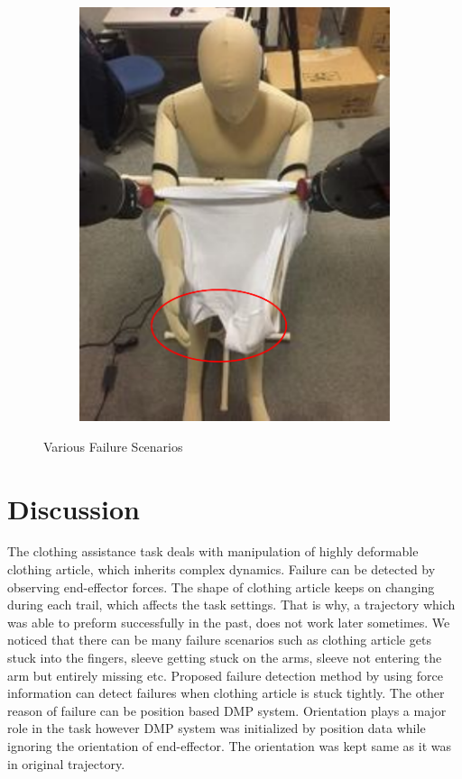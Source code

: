 \documentclass[sigconf]{acmart}
\begin{document}
\begin{figure}
\begin{subfigure}{.4\linewidth}
		\includegraphics[width=.98\linewidth]{failure_scenario_4}
	\end{subfigure}
	\caption{Various Failure Scenarios}
	\label{fig:failure_scenarios}
\end{figure}

\section{Discussion}
\label{sec:discussion}
The clothing assistance task deals with manipulation of highly deformable clothing article, which inherits complex dynamics. Failure can be detected by observing end-effector forces. The shape of clothing article keeps on changing during each trail, which affects the task settings. That is why, a trajectory which was able to preform successfully in the past, does not work later sometimes. We noticed that there can be many failure scenarios such as clothing article gets stuck into the fingers, sleeve getting stuck on the arms, sleeve not entering the arm but entirely missing etc. Proposed failure detection method by using force information can detect failures when clothing article is stuck tightly. The other reason of failure can be position based DMP system. Orientation plays a major role in the task however DMP system was initialized by position data while ignoring the orientation of end-effector. The orientation was kept same as it was in original trajectory. 
\end{document}
